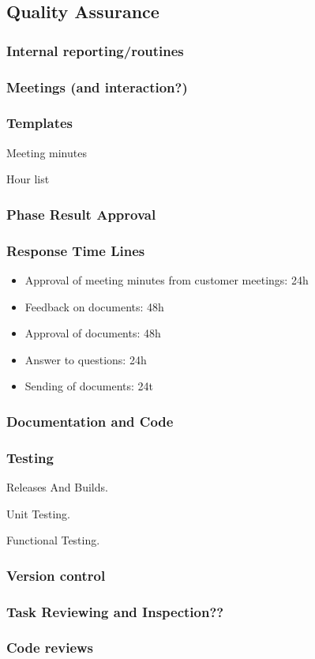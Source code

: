 \subsection{Quality Assurance}

\subsubsection{Internal reporting/routines}

\subsubsection{Meetings (and interaction?)}

\subsubsection{Templates}

Meeting minutes

Hour list


\subsubsection{Phase Result Approval}

\subsubsection{Response Time Lines}
\begin{itemize}
	\item Approval of meeting minutes from customer meetings: 24h
	\item Feedback on documents: 48h
	\item Approval of documents: 48h
	\item Answer to questions: 24h
	\item Sending of documents: 24t
\end{itemize}

\subsubsection{Documentation and Code}

\subsubsection{Testing}

Releases And Builds.

Unit Testing.

Functional Testing.

\subsubsection{Version control}

\subsubsection{Task Reviewing and Inspection??}

\subsubsection{Code reviews}
